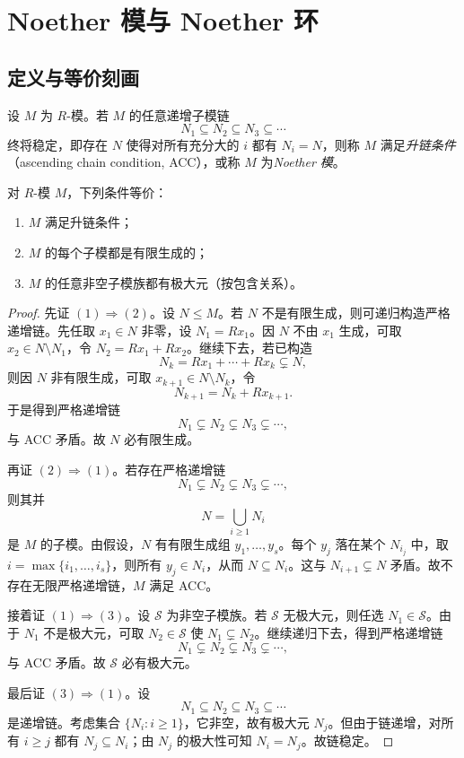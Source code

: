 \section{Noether 模与 Noether 环}

\subsection{定义与等价刻画}

\begin{definition}
设 $M$ 为 $R$-模。若 $M$ 的任意递增子模链
\[
N_1\subseteq N_2\subseteq N_3\subseteq \cdots
\]
终将稳定，即存在 $N$ 使得对所有充分大的 $i$ 都有 $N_i=N$，则称 $M$ 满足\emph{升链条件}（ascending chain condition, ACC），或称 $M$ 为\emph{Noether 模}。
\end{definition}

\begin{theorem}
对 $R$-模 $M$，下列条件等价：
\begin{enumerate}[label=(\arabic*)]
  \item $M$ 满足升链条件；
  \item $M$ 的每个子模都是有限生成的；
  \item $M$ 的任意非空子模族都有极大元（按包含关系）。
\end{enumerate}
\end{theorem}

\begin{proof}
先证 $(1)\Rightarrow(2)$。设 $N\le M$。若 $N$ 不是有限生成，则可递归构造严格递增链。先任取 $x_1\in N$ 非零，设 $N_1=Rx_1$。因 $N$ 不由 $x_1$ 生成，可取 $x_2\in N\setminus N_1$，令 $N_2=Rx_1+Rx_2$。继续下去，若已构造
\[
N_k=Rx_1+\cdots+Rx_k\subsetneq N,
\]
则因 $N$ 非有限生成，可取 $x_{k+1}\in N\setminus N_k$，令
\[
N_{k+1}=N_k+Rx_{k+1}.
\]
于是得到严格递增链
\[
N_1\subsetneq N_2\subsetneq N_3\subsetneq \cdots,
\]
与 ACC 矛盾。故 $N$ 必有限生成。

再证 $(2)\Rightarrow(1)$。若存在严格递增链
\[
N_1\subsetneq N_2\subsetneq N_3\subsetneq\cdots,
\]
则其并
\[
N=\bigcup_{i\ge 1}N_i
\]
是 $M$ 的子模。由假设，$N$ 有有限生成组 $y_1,\dots,y_s$。每个 $y_j$ 落在某个 $N_{i_j}$ 中，取 $i=\max\{i_1,\dots,i_s\}$，则所有 $y_j\in N_i$，从而 $N\subseteq N_i$。这与 $N_{i+1}\subsetneq N$ 矛盾。故不存在无限严格递增链，$M$ 满足 ACC。

接着证 $(1)\Rightarrow(3)$。设 $\mathcal S$ 为非空子模族。若 $\mathcal S$ 无极大元，则任选 $N_1\in \mathcal S$。由于 $N_1$ 不是极大元，可取 $N_2\in \mathcal S$ 使 $N_1\subsetneq N_2$。继续递归下去，得到严格递增链
\[
N_1\subsetneq N_2\subsetneq N_3\subsetneq\cdots,
\]
与 ACC 矛盾。故 $\mathcal S$ 必有极大元。

最后证 $(3)\Rightarrow(1)$。设
\[
N_1\subseteq N_2\subseteq N_3\subseteq\cdots
\]
是递增链。考虑集合 $\{N_i:i\ge 1\}$，它非空，故有极大元 $N_j$。但由于链递增，对所有 $i\ge j$ 都有 $N_j\subseteq N_i$；由 $N_j$ 的极大性可知 $N_i=N_j$。故链稳定。
\end{proof}


